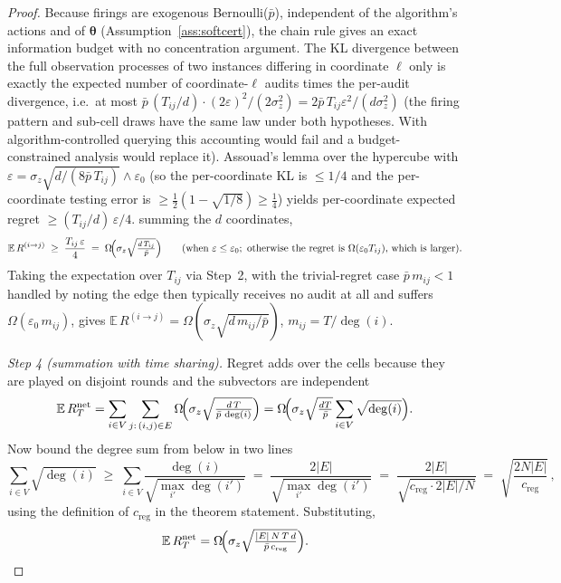 \documentclass[11pt]{article}
\begin{document}
\begin{proof}
Because firings are exogenous Bernoulli($\bar p$), independent of the
algorithm's actions and of $\bm\theta$
(Assumption~\ref{ass:softcert}), the chain rule gives an exact
information budget with no concentration argument. The KL divergence
between the full observation processes of two instances differing in
coordinate $\ell$ only is exactly the expected number of coordinate-$\ell$
audits times the per-audit divergence, i.e.\ at most
$\bar p\,(T_{ij}/d)\cdot(2\varepsilon)^2/(2\sigma_z^2)
=2\bar p\,T_{ij}\varepsilon^2/(d\sigma_z^2)$
(the firing pattern and sub-cell draws have the same law under both
hypotheses. With algorithm-controlled querying this accounting would
fail and a budget-constrained analysis would replace it).  Assouad's
lemma over the hypercube \citep{dani2008} with
$\varepsilon=\sigma_z\sqrt{d/(8\bar p\,T_{ij})}\wedge\varepsilon_0$
(so the per-coordinate KL is $\leq1/4$ and the per-coordinate testing
error is $\geq\tfrac12(1-\sqrt{1/8})\geq\tfrac14$) yields
per-coordinate expected regret $\geq(T_{ij}/d)\,\varepsilon/4$.
summing the $d$ coordinates,
\[
\mathbb E\,R^{(i\to j)}
\;\geq\;\frac{T_{ij}\,\varepsilon}{4}
\;=\;\Omega\!\Bigl(\sigma_z\sqrt{\tfrac{d\,T_{ij}}{\bar p}}\Bigr)
\qquad(\text{when }\varepsilon\leq\varepsilon_0;\ \text{otherwise the
regret is }\Omega(\varepsilon_0T_{ij})\text{, which is larger}).
\]
Taking the expectation over $T_{ij}$ via Step~2, with the
trivial-regret case $\bar p\,m_{ij}<1$ handled by noting the edge then
typically receives no audit at all and suffers
$\Omega(\varepsilon_0\,m_{ij})$, gives
$\mathbb E\,R^{(i\to j)}=\Omega(\sigma_z\sqrt{d\,m_{ij}/\bar p})$,
$m_{ij}=T/\deg(i)$.

\emph{Step 4 (summation with time sharing).}  Regret adds over the
cells because they are played on disjoint rounds and the subvectors
are independent \[
\mathbb E\,R_T^{\mathrm{net}}
=\sum_{i\in V}\sum_{j:\,(i,j)\in E}
\Omega\!\Bigl(\sigma_z\sqrt{\tfrac{d\,T}{\bar p\,\deg(i)}}\Bigr)
=\Omega\!\Bigl(\sigma_z\sqrt{\tfrac{dT}{\bar p}}
\sum_{i\in V}\sqrt{\deg(i)}\Bigr).
\]
Now bound the degree sum from below in two lines \[
\sum_{i\in V}\sqrt{\deg(i)}
\;\geq\;\sum_{i\in V}\frac{\deg(i)}{\sqrt{\max_{i'}\deg(i')}}
\;=\;\frac{2|E|}{\sqrt{\max_{i'}\deg(i')}}
\;=\;\frac{2|E|}{\sqrt{c_{\mathrm{reg}}\cdot 2|E|/N}}
\;=\;\sqrt{\frac{2N|E|}{c_{\mathrm{reg}}}}\,,
\]
using the definition of $c_{\mathrm{reg}}$ in the theorem statement.
Substituting,
\[
\mathbb E\,R_T^{\mathrm{net}}
=\Omega\!\Bigl(\sigma_z\sqrt{\tfrac{|E|\,N\,T\,d}{\bar p\,c_{\mathrm{reg}}}}\Bigr).
\qedhere
\]
\end{proof}
\end{document}
